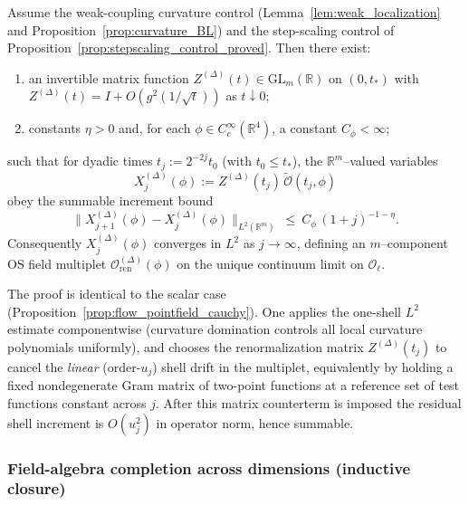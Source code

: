\begin{proposition}\label{prop:flow_operator_multiplet_cauchy}
Assume the weak-coupling curvature control (Lemma~\ref{lem:weak_localization} and Proposition~\ref{prop:curvature_BL})
and the step-scaling control of Proposition~\ref{prop:stepscaling_control_proved}.
Then there exist:
\begin{enumerate}[leftmargin=*]
\item an invertible matrix function $Z^{(\Delta)}(t)\in \mathrm{GL}_m(\mathbb R)$ on $(0,t_*)$ with $Z^{(\Delta)}(t)=I+O(g^2(1/\sqrt t))$ as $t\downarrow 0$;
\item constants $\eta>0$ and, for each $\phi\in C_c^{\infty}(\mathbb R^4)$, a constant $C_\phi<\infty$;
\end{enumerate}
such that for dyadic times $t_j:=2^{-2j}t_0$ (with $t_0\le t_*$), the $\mathbb R^m$--valued variables
\[
X^{(\Delta)}_j(\phi):=Z^{(\Delta)}(t_j)\,\widetilde{\mathbf{\mathcal O}}(t_j,\phi)
\]
obey the summable increment bound
\[
\|X^{(\Delta)}_{j+1}(\phi)-X^{(\Delta)}_j(\phi)\|_{L^2(\mathbb R^m)}\ \le\ C_\phi\,(1+j)^{-1-\eta}.
\]
Consequently $X^{(\Delta)}_j(\phi)$ converges in $L^2$ as $j\to\infty$, defining an $m$--component OS field multiplet
$\mathcal O^{(\Delta)}_{\mathrm{ren}}(\phi)$ on the unique continuum limit on $\mathcal O_{\ell}$.
\end{proposition}

\begin{remark}
The proof is identical to the scalar case (Proposition~\ref{prop:flow_pointfield_cauchy}).
One applies the one-shell $L^2$ estimate componentwise (curvature domination controls all local curvature polynomials uniformly),
and chooses the renormalization matrix $Z^{(\Delta)}(t_j)$ to cancel the \emph{linear} (order-$u_j$) shell drift in the multiplet,
equivalently by holding a fixed nondegenerate Gram matrix of two-point functions at a reference set of test functions constant across $j$.
After this matrix counterterm is imposed the residual shell increment is $O(u_j^2)$ in operator norm, hence summable.
\end{remark}

\subsubsection{Field-algebra completion across dimensions (inductive closure)}
\label{subsec:field_algebra_across_dimensions}

